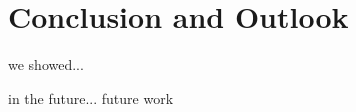 
\chapter{Conclusion and Outlook}
\label{ch:ConclusionOutlook}

we showed...

in the future...
future work
